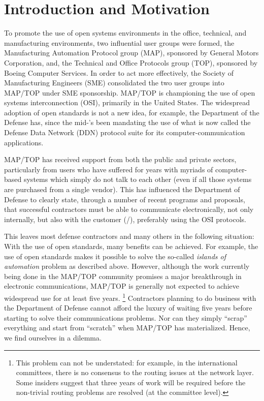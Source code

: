 
\section	{Introduction and Motivation}
To promote the use of open systems environments in the office,
technical, and manufacturing environments,
two influential user groups were formed,
the Manufacturing Automation Protocol group (MAP),
sponsored by General Motors Corporation,
and, the Technical and Office Protocols group (TOP),
sponsored by Boeing Computer Services.
In order to act more effectively,
the Society of Manufacturing Engineers (SME)
consolidated the two user groups into MAP/TOP under SME sponsorship.
MAP/TOP is championing the use of open systems interconnection (OSI),
primarily in the United States.
The widespread adoption of open standards is not a new idea,
for example,
the Department of the Defense has,
since the mid-{\/}'s been mandating the use of what is now called
the Defense Data Network (DDN) protocol suite for its computer-communication
applications.

MAP/TOP has received support from both the public and private sectors,
particularly from users who have suffered for years with myriads of
computer-based systems which simply do not talk to each other
(even if all those systems are purchased from a single vendor).
This has influenced the Department of Defense to clearly state,
through a number of recent programs and proposals,
that successful contractors must be able to communicate electronically,
not only internally, but also with the customer (\dod/),
preferably using the OSI protocols.

This leaves most defense contractors and many others in the following
situation:
With the use of open standards, many benefits can be achieved.
For example,
the use of open standards makes it possible to solve the so-called
{\em islands of automation\/} problem as described above.
However,
although the work currently being done in the MAP/TOP community promises a
major breakthrough in electronic communications,
MAP/TOP is generally not expected to achieve widespread use for at least
five years.%
\footnote{This problem can not be understated:
for example,
in the international committees,
there is no consensus to the routing issues at the network layer.
Some insiders suggest that three years of work will be required before
the non-trivial routing problems are resolved (at the committee level).}
Contractors planning to do business with the Department of Defense cannot
afford the luxury of waiting five years before starting to solve their
communications problems.
Nor can they simply ``scrap'' everything and start from ``scratch'' when
MAP/TOP has materialized.
Hence, we find ourselves in a dilemma.

